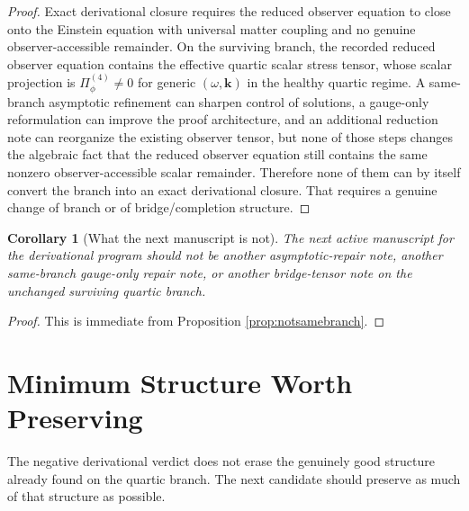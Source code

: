 \documentclass[11pt]{article}
\newtheorem{corollary}{Corollary}
\begin{document}
\begin{proof}
Exact derivational closure requires the reduced observer equation to close onto the Einstein equation with universal matter coupling and no genuine observer-accessible remainder. On the surviving branch, the recorded reduced observer equation contains the effective quartic scalar stress tensor, whose scalar projection is \(\Pi_\phi^{(4)}\neq 0\) for generic \((\omega,\mathbf{k})\) in the healthy quartic regime. A same-branch asymptotic refinement can sharpen control of solutions, a gauge-only reformulation can improve the proof architecture, and an additional reduction note can reorganize the existing observer tensor, but none of those steps changes the algebraic fact that the reduced observer equation still contains the same nonzero observer-accessible scalar remainder. Therefore none of them can by itself convert the branch into an exact derivational closure. That requires a genuine change of branch or of bridge/completion structure.
\end{proof}

\begin{corollary}[What the next manuscript is not]
\label{cor:not}
The next active manuscript for the derivational program should not be another asymptotic-repair note, another same-branch gauge-only repair note, or another bridge-tensor note on the unchanged surviving quartic branch.
\end{corollary}

\begin{proof}
This is immediate from Proposition \ref{prop:notsamebranch}.
\end{proof}

\section{Minimum Structure Worth Preserving}

The negative derivational verdict does not erase the genuinely good structure already found on the quartic branch. The next candidate should preserve as much of that structure as possible.
\end{document}
